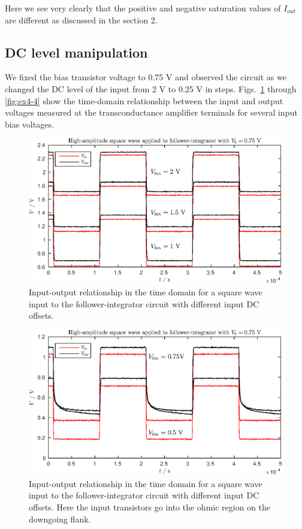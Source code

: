 Here we see very clearly that the positive and negative saturation values of \(I_{out}\) are different as discussed in the section 2. 

\subsection{DC level manipulation}
We fixed the bias transistor voltage to 0.75 V and observed the circuit as we changed the DC level of the input from 2 V to 0.25 V in steps. Figs.~\ref{fig:ex4-2} through
\ref{fig:ex4-4} show the time-domain relationship between the input and output voltages measured at the transconductance amplifier terminals for several input bias voltages.
\begin{figure}[!htb]
    \center
    \includegraphics{ex4-1.eps}
    \caption{Input-output relationship in the time domain for a square wave input to the follower-integrator circuit with different input DC offsets.}
    \label{fig:ex4-2}
\end{figure}
\begin{figure}[!htb]
    \center
    \includegraphics{ex4-2.eps}
    \caption{Input-output relationship in the time domain for a square wave input to the follower-integrator circuit with different input DC offsets. Here the
    input transistors go into the ohmic region on the downgoing flank.}
    \label{fig:ex4-3}
\end{figure}
